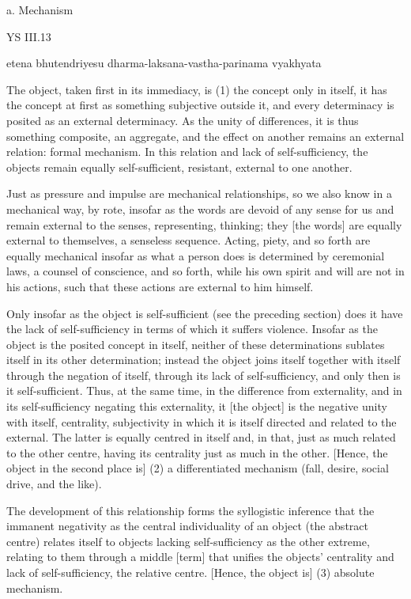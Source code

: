 a. Mechanism

YS III.13

etena bhutendriyesu dharma-laksana-vastha-parinama vyakhyata

The object, taken first in its immediacy, is
(1) the concept only in itself,
it has the concept at first as something subjective outside it, and
every determinacy is posited as an external determinacy.
As the unity of differences, it is thus something composite, an aggregate,
and the effect on another remains an external relation: formal mechanism.
In this relation and lack of self-sufficiency, the objects remain equally
self-sufficient, resistant, external to one another.

Just as pressure and impulse are mechanical relationships,
so we also know in a mechanical way, by rote,
insofar as the words are devoid of any sense for us and
remain external to the senses, representing, thinking;
they [the words] are equally external to themselves, a senseless sequence.
Acting, piety, and so forth are equally mechanical
insofar as what a person does is determined by
ceremonial laws, a counsel of conscience, and so forth,
while his own spirit and will are not in his actions,
such that these actions are external to him himself.

Only insofar as the object is self-sufficient
(see the preceding section)
does it have the lack of self-sufficiency
in terms of which it suffers violence.
Insofar as the object is the posited concept in itself,
neither of these determinations sublates itself
in its other determination;
instead the object joins itself together with itself
through the negation of itself,
through its lack of self-sufficiency,
and only then is it self-sufficient.
Thus, at the same time, in the difference from externality,
and in its self-sufficiency negating this externality,
it [the object] is the negative unity with itself, centrality,
subjectivity in which it is itself directed and related to the external.
The latter is equally centred in itself and, in that, just as much related
to the other centre, having its centrality just as much in the other.
[Hence, the object in the second place is]
(2) a differentiated mechanism (fall, desire, social drive, and the like).

The development of this relationship forms the syllogistic inference
that the immanent negativity as the central individuality of an object
(the abstract centre) relates itself to objects lacking self-sufficiency as
the other extreme, relating to them through a middle [term] that
unifies the objects' centrality and lack of self-sufficiency,
the relative centre. [Hence, the object is]
(3) absolute mechanism.

